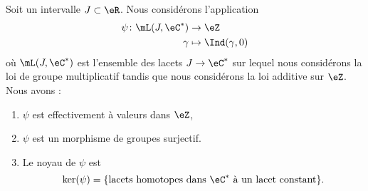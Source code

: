 \begin{proposition}       \label{PROPooGAOIooFTOuli}
    Soit un intervalle \( J\subset \eR\). Nous considérons l'application
    \begin{equation}
        \begin{aligned}
            \psi\colon \mL(J, \eC^*)&\to \eZ \\
            \gamma&\mapsto \Ind(\gamma,0)
        \end{aligned}
    \end{equation}
    où \( \mL(J, \eC^*)\) est l'ensemble des lacets \( J\to \eC^*\) sur lequel nous considérons la loi de groupe multiplicatif tandis que nous considérons la loi additive sur \( \eZ\). Nous avons :
    \begin{enumerate}
        \item       \label{ITEMooKCRIooSEyhlp}
            \( \psi\) est effectivement à valeurs dans \( \eZ\),
        \item
            \( \psi\) est un morphisme de groupes surjectif.
        \item       \label{ITEMooZFXTooDCXTVU}
        Le noyau de \( \psi\) est
        \begin{equation}
            \ker(\psi)=\{ \text{lacets homotopes dans \( \eC^*\) à un lacet constant} \}.
        \end{equation}
    \end{enumerate}
\end{proposition}

